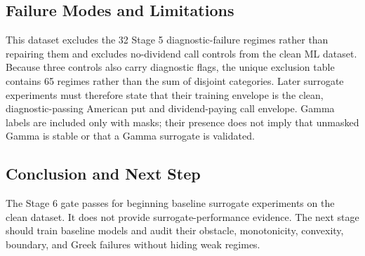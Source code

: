 \documentclass[11pt]{article}
\begin{document}


\subsection{Failure Modes and Limitations}
This dataset excludes the 32 Stage 5 diagnostic-failure regimes rather than
repairing them and excludes no-dividend call controls from the clean ML
dataset. Because three controls also carry diagnostic flags, the unique
exclusion table contains 65 regimes rather than the sum of disjoint categories.
Later surrogate experiments must therefore state that their training envelope
is the clean, diagnostic-passing American put and dividend-paying call
envelope. Gamma labels are included only with masks; their presence does not
imply that unmasked Gamma is stable or that a Gamma surrogate is validated.

\subsection{Conclusion and Next Step}
The Stage 6 gate passes for beginning baseline surrogate experiments on the clean dataset. It does not provide surrogate-performance evidence. The next stage should train baseline models and audit their obstacle, monotonicity, convexity, boundary, and Greek failures without hiding weak regimes.
\end{document}
